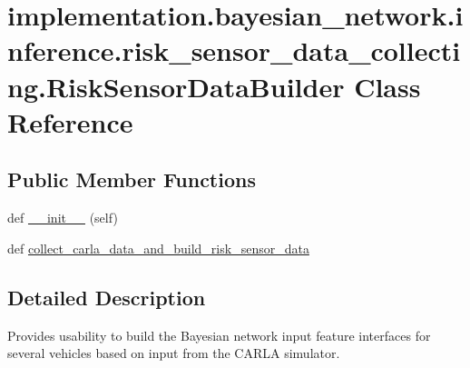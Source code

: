\hypertarget{classimplementation_1_1bayesian__network_1_1inference_1_1risk__sensor__data__collecting_1_1_risk_sensor_data_builder}{}\section{implementation.\+bayesian\+\_\+network.\+inference.\+risk\+\_\+sensor\+\_\+data\+\_\+collecting.\+Risk\+Sensor\+Data\+Builder Class Reference}
\label{classimplementation_1_1bayesian__network_1_1inference_1_1risk__sensor__data__collecting_1_1_risk_sensor_data_builder}
\subsection*{Public Member Functions}
\begin{DoxyCompactItemize}
\item 
def \hyperlink{classimplementation_1_1bayesian__network_1_1inference_1_1risk__sensor__data__collecting_1_1_risk_sensor_data_builder_adc48adc116aa5beaef6b8a0e255e6144}{\+\_\+\+\_\+init\+\_\+\+\_\+} (self)
\item 
def \hyperlink{classimplementation_1_1bayesian__network_1_1inference_1_1risk__sensor__data__collecting_1_1_risk_sensor_data_builder_a2e0989c9826f77865048170e043b9dbb}{collect\+\_\+carla\+\_\+data\+\_\+and\+\_\+build\+\_\+risk\+\_\+sensor\+\_\+data}
\end{DoxyCompactItemize}


\subsection{Detailed Description}
\begin{DoxyVerb}Provides usability to build the Bayesian network input feature interfaces for several vehicles based on input
from the CARLA simulator.
\end{DoxyVerb}
 

